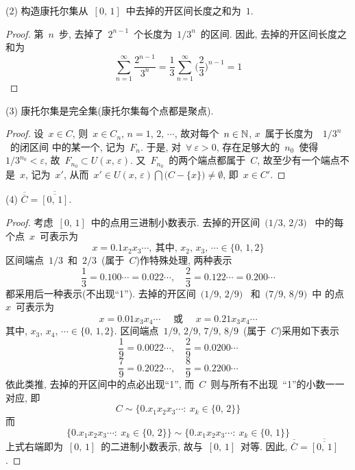 (2) 构造康托尔集从~$[0,\,1]$~中去掉的开区间长度之和为~$1$.

\smallskip

\begin{proof}
第~$n$~步, 去掉了~$2^{n-1}$~个长度为~$1/3^n$~的区间. 因此, 去掉的开区间长度之和为
\[
\sum^\infty _{n=1} \frac{2^{n-1}}{3^n} = \frac{1}{3}\sum^\infty _{n=1} \Big(\frac{2}{3}\Big)^{n-1} = 1
\]
\end{proof}

\smallskip

(3) 康托尔集是完全集(康托尔集每个点都是聚点).

\smallskip

\begin{proof}
设~$x \in C$, 则~$x \in C_n, \, n =1,\,2,\,\cdots$, 故对每个~$n \in \mathbb{N}$, $x$~属于长度为~~$1/3^n$~的闭区间
中的某一个, 记为~$F_n$. 于是, 对~$\forall~\varepsilon > 0$, 存在足够大的~$n_0$~使得~$1/3^{n_0} < \varepsilon$, 故~$F_{n_0} \subset U(x,\,\varepsilon)$. 又~$F_{n_0}$~的两个端点都属于~$C$, 故至少有一个端点不是~$x$, 记为~$x'$, 从而~$x' \in U(x,\,\varepsilon) \bigcap \big(C - \{x\}\big) \neq \emptyset$, 即~$x \in C'$.
\end{proof}

(4) $\overline{\overline{C}} = \overline{\overline{[0,\,1]}}$.

\smallskip

\begin{proof}
考虑~$[0,\,1]$~中的点用三进制小数表示. 去掉的开区间~$\big(1/3,\,2/3\big)$~
中的每个点~$x$~可表示为
\[
x = 0.1x_2x_3\cdots,\ \mbox{其中, } x_2,\,x_3,\,\cdots \in \{0,\,1,2\}
\]
区间端点~$1/3$~和~$2/3$~(属于~$C$)作特殊处理, 两种表示
\[
\frac{1}{3} = 0.100\cdots = 0.022\cdots, \quad \frac{2}{3} = 0.122\cdots = 0.200\cdots
\]
都采用后一种表示(不出现``1''). 去掉的开区间~$\big(1/9,\,2/9\big)$~
和~$\big(7/9,\,8/9\big)$~中
的点~$x$~可表示为
\[
x = 0.01x_3x_4\cdots \quad \mbox{~或~} \quad x = 0.21x_3x_4\cdots
\]
其中,  $x_3,\,x_4,\,\cdots \in \{0,\,1,2\}$. 区间端点~$1/9,\,2/9,\,7/9,\,8/9$~(属于~$C$)采用如下表示
\[
\frac{1}{9} = 0.0022\cdots, \quad \frac{2}{9} = 0.0200\cdots
\]
\[
\frac{7}{9} = 0.2022\cdots, \quad \frac{8}{9} = 0.2200\cdots
\]
依此类推, 去掉的开区间中的点必出现``1'', 而~$C$~则与所有不出现~``1''的小数一一对应, 即
\[
C \sim \big\{0.x_1x_2x_3\cdots: \: x_k \in \{0,\,2\}\big\}
\]
而
\[
\big\{0.x_1x_2x_3\cdots: \: x_k \in \{0,\,2\}\big\} \sim \big\{0.x_1x_2x_3\cdots: \: x_k \in \{0,\,1\}\big\}
\]
上式右端即为~$[0,\,1]$~的二进制小数表示, 故与~$[0,\,1]$~对等. 因此,
$\overline{\overline{C}} = \overline{\overline{[0,\,1]}}$.
\end{proof}


